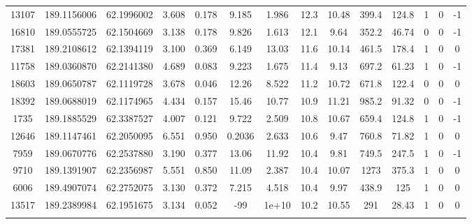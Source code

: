 \begin{table*}
\begin{center}
\begin{tabular}{ cccccccccccccc }
       13107 & 189.1156006 &  62.1996002 &  3.608 &  0.178 &     9.185 &     1.986 &    12.3 &   10.48 &     399.4 &     124.8 &      1 &      0 &       -1 \\ 
       16810 & 189.0555725 &  62.1504669 &  3.138 &  0.178 &     9.826 &     1.613 &    12.1 &    9.64 &     352.2 &     46.74 &      0 &      0 &       -1 \\ 
       17381 & 189.2108612 &  62.1394119 &  3.100 &  0.369 &     6.149 &     13.03 &    11.6 &   10.14 &     461.5 &     178.4 &      1 &      0 &        0 \\ 
       11758 & 189.0360870 &  62.2141380 &  4.689 &  0.083 &     9.223 &     1.675 &    11.4 &    9.13 &     697.2 &     61.23 &      1 &      0 &       -1 \\ 
       18603 & 189.0650787 &  62.1119728 &  3.678 &  0.046 &     12.26 &     8.522 &    11.2 &   10.72 &     671.8 &     122.4 &      0 &      0 &        0 \\ 
       18392 & 189.0688019 &  62.1174965 &  4.434 &  0.157 &     15.46 &     10.77 &    10.9 &   11.21 &     985.2 &     91.32 &      0 &      0 &       -1 \\ 
        1735 & 189.1885529 &  62.3387527 &  4.007 &  0.121 &     9.722 &     2.509 &    10.8 &   10.67 &     659.4 &     124.8 &      1 &      0 &       -1 \\ 
       12646 & 189.1147461 &  62.2050095 &  6.551 &  0.950 &    0.2036 &     2.633 &    10.6 &    9.47 &     760.8 &     71.82 &      1 &      0 &        0 \\ 
        7959 & 189.0670776 &  62.2537880 &  3.190 &  0.377 &     13.06 &     11.92 &    10.4 &    9.81 &     749.5 &     247.5 &      1 &      0 &       -1 \\ 
        9710 & 189.1391907 &  62.2356987 &  5.551 &  0.850 &     11.09 &     2.387 &    10.4 &   10.07 &      1273 &     375.3 &      1 &      0 &        0 \\ 
        6006 & 189.4907074 &  62.2752075 &  3.130 &  0.372 &     7.215 &     4.518 &    10.4 &    9.97 &     438.9 &       125 &      1 &      0 &        0 \\ 
       13517 & 189.2389984 &  62.1951675 &  3.134 &  0.052 &       -99 &     1e+10 &    10.2 &   10.55 &       291 &     28.43 &      1 &      0 &        0 \\ 
    
    \hline

    \vspace{-0.5ex}


\end{tabular}


\end{center}
\end{table*}

